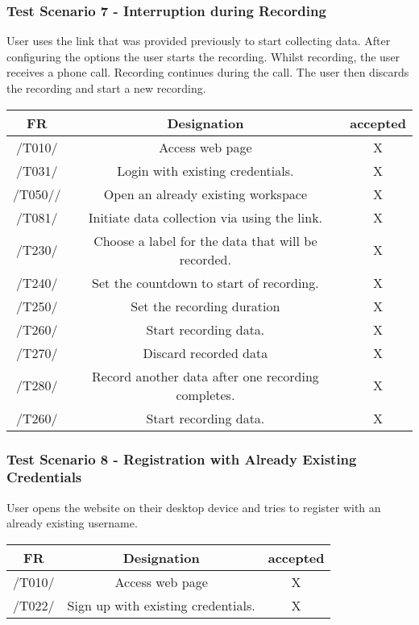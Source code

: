 \subsubsection{Test Scenario 7 - Interruption during Recording}
User uses the link that was provided previously to start collecting data. After configuring
the options the user starts the recording. Whilst recording, the user receives a phone
call. Recording continues during the call. The user then discards the recording and start
a new recording.
\begin{table}[h]
\begin{tabular}{!{\VRule}c!{\VRule}c!{\VRule}c!{\VRule}}
\hline
FR     & Designation                                                                    &accepted                \\
\hline
  /T010/ &  Access web page &   X  \\
 \hline
 /T031/  &  Login with existing credentials. &   X  \\
 \hline
 /T050//  &  Open an already existing workspace &   X  \\
 \hline
  /T081/  &  Initiate data collection via using the link. &   X  \\
 \hline
  /T230/   &  Choose a label for the data that will be recorded. &   X  \\
 \hline
 /T240/  &   Set the countdown to start of recording. &   X  \\
 \hline
  /T250/  &  Set the recording duration &   X \\
 \hline
 /T260/  &  Start recording data. &   X  \\
 \hline
  /T270/  &  Discard recorded data &  X   \\
 \hline
  /T280/   &  Record another data after one recording completes. &   X  \\
 \hline
 /T260/  &   Start recording data.
 &   X \\
 \hline
\end{tabular}
\end{table}
\clearpage
\subsubsection{Test Scenario 8 - Registration with Already Existing Credentials}
User opens the website on their desktop device and tries to register with an already
existing username.

\begin{table}[h]
\begin{tabular}{!{\VRule}c!{\VRule}c!{\VRule}c!{\VRule}}
\hline
FR     & Designation                                                                    &accepted                \\
\hline
  /T010/ &  Access web page &   X  \\
 \hline
 /T022/  &   Sign up with existing credentials. &   X  \\
 \hline

\end{tabular}
\end{table}
